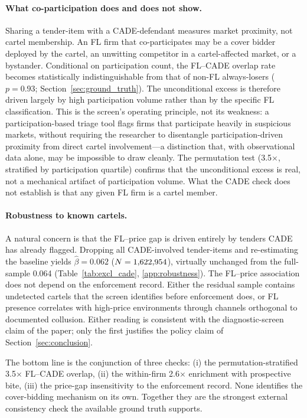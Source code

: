 \paragraph{What co-participation does and does not show.}
Sharing a tender-item with a CADE-defendant measures market
proximity, not cartel membership. An FL firm that co-participates
may be a cover bidder deployed by the cartel, an unwitting
competitor in a cartel-affected market, or a bystander.
Conditional on participation count, the FL--CADE overlap rate
becomes statistically indistinguishable from that of non-FL
always-losers ($p = 0.93$; Section~\ref{sec:ground_truth}).
The unconditional excess is therefore driven largely by high
participation volume rather than by the specific FL
classification. This is the screen's operating principle, not
its weakness: a participation-based triage tool flags firms
that participate heavily in suspicious markets, without
requiring the researcher to disentangle participation-driven
proximity from direct cartel involvement---a distinction that,
with observational data alone, may be impossible to draw
cleanly. The permutation test (3.5$\times$, stratified by
participation quartile) confirms that the unconditional excess
is real, not a mechanical artifact of participation volume.
What the CADE check does not establish is that any given FL
firm is a cartel member.

\paragraph{Robustness to known cartels.}
A natural concern is that the FL--price gap is driven entirely
by tenders CADE has already flagged. Dropping all \valCADEpermPerm
CADE-involved tender-items and re-estimating the baseline
yields $\hat{\beta} = 0.062$ ($N = 1{,}622{,}954$), virtually
unchanged from the full-sample 0.064 (Table~\ref{tab:excl_cade},
\ref{app:robustness}). The FL--price association does not
depend on the enforcement record. Either the residual sample
contains undetected cartels that the screen identifies before
enforcement does, or FL presence correlates with high-price
environments through channels orthogonal to documented
collusion. Either reading is consistent with the
diagnostic-screen claim of the paper; only the first justifies
the policy claim of Section~\ref{sec:conclusion}.

The bottom line is the conjunction of three checks: (i) the
permutation-stratified 3.5$\times$ FL--CADE overlap, (ii) the
within-firm 2.6$\times$ enrichment with prospective bite, (iii)
the price-gap insensitivity to the enforcement record. None
identifies the cover-bidding mechanism on its own. Together
they are the strongest external consistency check the available
ground truth supports.
